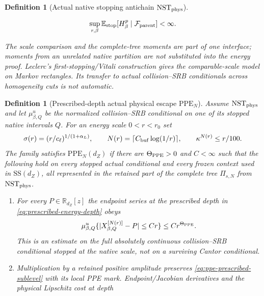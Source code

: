 \documentclass[11pt]{article}
\newtheorem{definition}[theorem]{Definition}
\begin{document}
\begin{definition}[Actual native stopping antichain
$\mathrm{NST}_{\rm phys}$]
\begin{enumerate}[label=\textup{(NST\arabic*)}]
      \begin{equation}
      \label{eq:stopped-H-moment}
       \sup_{r,\beta}
       \mathbb E_{\rm stop}[H_\beta^p\mid\mathcal F_{\rm parent}]<\infty .
      \end{equation}
\end{enumerate}
The scale comparison and the complete-tree moments are part of one interface;
moments from an unrelated native partition are not substituted into the
energy proof.  Leclerc's first-stopping/Vitali construction
\cite[Section~4]{Leclerc2026} gives the comparable-scale model on Markov
rectangles.  Its transfer to actual
collision--SRB conditionals across homogeneity cuts is not automatic.
\end{definition}

\begin{definition}[Prescribed-depth actual physical escape
$\mathrm{PPE}_{N}$]
\label{def:physical-legal-extension}
Assume $\mathrm{NST}_{\rm phys}$ and let $\mu^u_{\beta,Q}$ be the
normalized collision--SRB conditional on one of its stopped native intervals
$Q$.  For an energy scale $0<r<r_0$ set
\begin{equation}
\label{eq:prescribed-energy-depth}
 \sigma(r)=(r/c_\ell)^{1/(1+\alpha_L)},\qquad
 N(r)=\lceil C_{\rm buf}\log(1/r)\rceil ,
 \qquad \kappa^{N(r)}\le r/100 .
\end{equation}
The family satisfies $\mathrm{PPE}_{N}(d_Z)$ if there are
$\Theta_{\rm PPE}>0$ and $C<\infty$ such that the following hold on every
stopped actual conditional and every frozen context used in
$\mathrm{SS}(d_Z)$, all represented in the retained part of the complete
tree $\Pi_{s,N}$ from $\mathrm{NST}_{\rm phys}$.
\begin{enumerate}[label=\textup{(PPE\arabic*)}]
\item For every $P\in\mathbb R_{d_Z}[z]$ the endpoint series at the
      \emph{prescribed depth in \eqref{eq:prescribed-energy-depth}} obeys
      \begin{equation}
      \label{eq:ppe-prescribed-sublevel}
       \mu^u_{\beta,Q}
       \{|X^{[N(r)]}_{\beta,Q}-P|\le C r\}
       \le C r^{\Theta_{\rm PPE}} .
      \end{equation}
      This is an estimate on the full absolutely continuous collision--SRB
      conditional stopped at the native scale, not on a surviving Cantor
      conditional.
\item Multiplication by a retained positive amplitude preserves
      \eqref{eq:ppe-prescribed-sublevel} with its local PPE mark.
      Endpoint/Jacobian derivatives and the physical Lipschitz cost at depth

\end{enumerate}
\end{definition}
\end{document}
